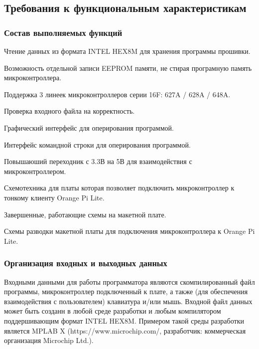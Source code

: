 

\subsection{Требования к функциональным характеристикам}
\subsubsection{Состав выполняемых функций}
\begin{my_enumerate}
\item Чтение данных из формата INTEL HEX8M для хранения программы прошивки.
\item Возможность отдельной записи EEPROM памяти, не стирая програмную память микроконтроллера.
\item Поддержка 3 линеек микроконтроллеров серии 16F: 627A / 628A / 648A.
\item Проверка входного файла на корректность.
\item Графический интерфейс для оперирования программой.
\item Интерфейс командной строки для оперирования программой.
\item Повышаюший переходник с 3.3В на 5В для взаимодействия с микроконтроллером.
\item Схемотехника для платы которая позволяет подключить микроконтроллер к тонкому клиенту Orange Pi Lite.
\item Завершенные, работающие схемы на макетной плате.
\item Схемы разводки макетной платы для подключения микроконтроллера к Orange Pi Lite. 
\end{my_enumerate}

\subsubsection{Организация входных и выходных данных}
Входными данными для работы программатора являются скомпилированный файл программы, микроконтроллер подключенный к плате, а также (для обеспечения взаимодействия с пользователем) клавиатура и/или мышь. Входной файл данных может быть созданн в любой среде разработки и любым компилятором поддершивающим формат INTEL HEX8M. Примером такой среды разработки является MPLAB X (https://www.microchip.com/, разработчик: коммерческая организация Microchip Ltd.).

